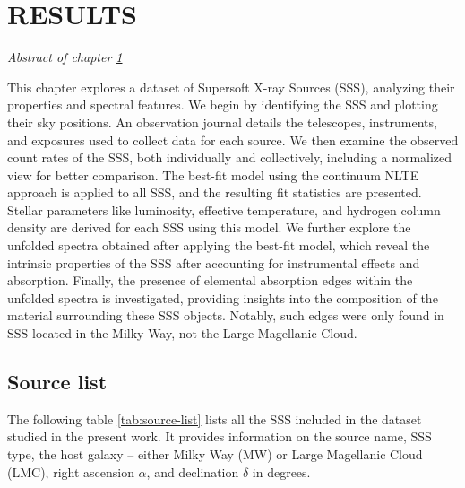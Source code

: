 \def\baselinestretch{1}
\chapter{RESULTS} \label{chap:results}
    \minitoc
    \begin{center}
    	\emph{Abstract of chapter \ref{chap:results}}
    \end{center}
    This chapter explores a dataset of Supersoft X-ray Sources (SSS), analyzing their properties and spectral features. We begin by identifying the SSS and plotting their sky positions. An observation journal details the telescopes, instruments, and exposures used to collect data for each source. We then examine the observed count rates of the SSS, both individually and collectively, including a normalized view for better comparison. The best-fit model using the continuum NLTE approach is applied to all SSS, and the resulting fit statistics are presented. Stellar parameters like luminosity, effective temperature, and hydrogen column density are derived for each SSS using this model. We further explore the unfolded spectra obtained after applying the best-fit model, which reveal the intrinsic properties of the SSS after accounting for instrumental effects and absorption. Finally, the presence of elemental absorption edges within the unfolded spectra is investigated, providing insights into the composition of the material surrounding these SSS objects. Notably, such edges were only found in SSS located in the Milky Way, not the Large Magellanic Cloud.
    
    \newpage
    \section{Source list}
    	The following table \ref{tab:source-list} lists all the SSS included in the dataset studied in the present work. It provides information on the source name, SSS type, the host galaxy -- either Milky Way (MW) or Large Magellanic Cloud (LMC), right ascension $\alpha$, and declination $\delta$ in degrees.
    	

